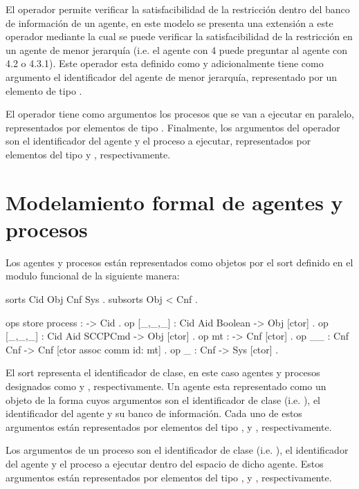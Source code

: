 El operador  permite verificar la satisfacibilidad de la restricci\'on dentro del banco de informaci\'on de un agente, en este modelo se presenta una extensi\'on a este operador mediante la cual se puede verificar la satisfacibilidad de la restricci\'on en un agente de menor jerarqu\'ia (i.e. el agente con  4 puede preguntar al agente con  4.2 o 4.3.1). Este operador esta definido como  y adicionalmente tiene como argumento el identificador del agente de menor jerarqu\'ia, representado por un elemento de tipo .

El operador \cde{_||_} tiene como argumentos los procesos que se van a ejecutar en paralelo, representados por elementos de tipo . Finalmente, los argumentos del operador \cde{<_>[_]} son el identificador del agente y el proceso a ejecutar, representados por elementos del tipo  y , respectivamente. 

\section{Modelamiento formal de agentes y procesos}
\label{state.rew}

Los agentes y procesos est\'an representados como objetos por el sort  definido en el modulo funcional  de la siguiente manera:

\begin{maude}
  sorts Cid Obj Cnf Sys .
  subsorts Obj < Cnf .
  
  ops store process : -> Cid .
  op [_,_,_] : Cid Aid Boolean -> Obj [ctor] .
  op [_,_,_] : Cid Aid SCCPCmd -> Obj [ctor] .
  op mt : -> Cnf [ctor] .
  op __ : Cnf Cnf -> Cnf [ctor assoc comm id: mt] .
  op {_} : Cnf -> Sys [ctor] .
\end{maude}

El sort  representa el identificador de clase, en este caso agentes y procesos designados como  y , respectivamente. Un agente esta representado como un objeto de la forma \cde{[_,_,_]} cuyos argumentos son el identificador de clase (i.e. ), el identificador del agente y su banco de informaci\'on. Cada uno de estos argumentos est\'an representados por elementos del tipo ,  y , respectivamente.

Los argumentos de un proceso son el identificador de clase (i.e. ), el identificador del agente y el proceso a ejecutar dentro del espacio de dicho agente. Estos argumentos est\'an representados por elementos del tipo ,  y , respectivamente.

